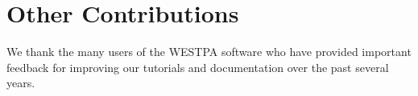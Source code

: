 \section{Other Contributions}
We thank the many users of the WESTPA software who have provided important feedback for improving our tutorials and documentation over the past several years.  